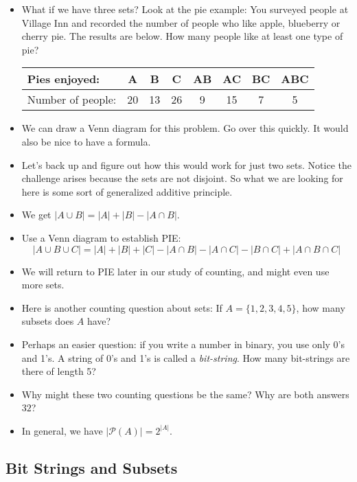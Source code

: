 \documentclass[12pt]{article}
\theoremstyle{plain}
\theoremstyle{definition}
\theoremstyle{remark}
\def\pow{\mathcal{P}}
\newcommand{\todayis}[1]{\clearpage{\rhead{\footnotesize #1}}}
\begin{document}
\begin{itemize}
	\item What if we have three sets?  Look at the pie example:  You surveyed people at Village Inn and recorded the number of people who like apple, blueberry or cherry pie.  The results are below.  How many people like at least one type of pie?
	\begin{center}
\begin{tabular}{|l|c|c|c|c|c|c|c|}
	\hline
	 Pies enjoyed: & A & B & C & AB & AC & BC & ABC\\
	\hline
	Number of people: & 20 & 13 & 26 & 9 & 15 & 7 & 5\\
	\hline
	\end{tabular}
	\end{center}
	\item We can draw a Venn diagram for this problem.  Go over this quickly.  It would also be nice to have a formula.
	\item Let's back up and figure out how this would work for just two sets.  Notice the challenge arises because the sets are not disjoint.  So what we are looking for here is some sort of generalized additive principle.
	\item We get $|A \cup B| = |A| + |B| - |A \cap B|$.
	\item Use a Venn diagram to establish PIE: \[|A \cup B \cup C| = |A| + |B| + |C| - |A \cap B| - |A \cap C| - |B \cap C| + |A \cap B \cap C|\]
	\item We will return to PIE later in our study of counting, and might even use more sets.

  	\item Here is another counting question about sets: If $A = \{1,2,3,4,5\}$, how many subsets does $A$ have?

  	\item Perhaps an easier question: if you write a number in binary, you use only 0's and 1's.  A string of 0's and 1's is called a \emph{bit-string}.  How many bit-strings are there of length 5?

  	\item Why might these two counting questions be the same?  Why are both answers $32$?

  	\item In general, we have $|\pow(A)| = 2^{|A|}$.
\end{itemize}







 \todayis{Wednesday, September 6}
 \subsection*{Bit Strings and Subsets}
\end{document}
